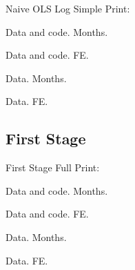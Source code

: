 \documentclass{beamer}
\begin{document}
\begin{frame}{}
\scalebox{0.5}{}
\end{frame}

\begin{frame}{}
\scalebox{0.5}{}
\end{frame}

\begin{frame}{}
\scalebox{0.5}{}
\end{frame}

\begin{frame}{}
\scalebox{0.5}{}
\end{frame}

\begin{frame}{Naive OLS Log}
Simple Print:

Data and code. Months.

Data and code. FE.

Data. Months.

Data. FE.
\end{frame}

\begin{frame}{}
\scalebox{0.65}{}
\end{frame}

\begin{frame}{}
\scalebox{0.65}{}
\end{frame}

\begin{frame}{}
\scalebox{0.65}{}
\end{frame}

\begin{frame}{}
\scalebox{0.65}{}
\end{frame}

\subsection{First Stage}

\begin{frame}{First Stage}
Full Print:

Data and code. Months.

Data and code. FE.

Data. Months.

Data. FE.
\end{frame}
\end{document}
